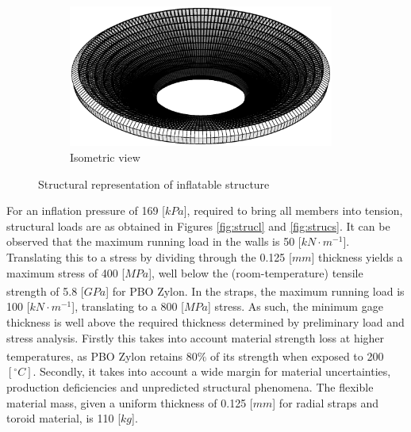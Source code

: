 \begin{figure}[h]
\begin{subfigure}[c]{0.5\textwidth}
		\includegraphics[width=0.96\textwidth]{./Figure/Structure/struc_rep.eps}
		\caption{Isometric view}
		\label{fig:iso}
	\end{subfigure}
\caption{Structural representation of inflatable structure}
\label{fig:strucreps}
\end{figure}

For an inflation pressure of 169 [$kPa$], required to bring all members into tension, structural loads are as obtained in Figures \ref{fig:strucl} and \ref{fig:strucs}. It can be observed that the maximum running load in the walls is 50 [$kN \cdot m^{-1}$]. Translating this to a stress by dividing through the 0.125 [$mm$] thickness yields a maximum stress of 400 [$MPa$], well below the (room-temperature) tensile strength of 5.8 [$GPa$] for PBO Zylon\textsuperscript{\textregistered}. In the straps, the maximum running load is 100 [$kN \cdot m^{-1}$], translating to a 800 [$MPa$] stress. As such, the minimum gage thickness is well above the required thickness determined by preliminary load and stress analysis. Firstly this takes into account material strength loss at higher temperatures, as PBO Zylon\textsuperscript{\textregistered} retains $80\%$ of its strength when exposed to 200 $\left[^{\circ}C\right]$. Secondly, it takes into account a wide margin for material uncertainties, production deficiencies and unpredicted structural phenomena. The flexible material mass, given a uniform thickness of 0.125 [$mm$] for radial straps and toroid material, is 110 [$kg$].

